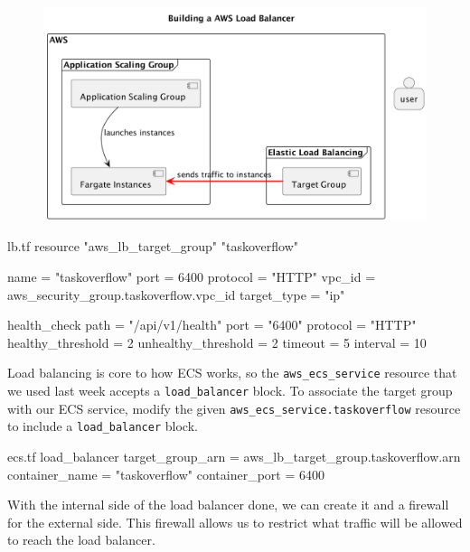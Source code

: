 \documentclass{csse4400}
\begin{document}
\begin{figure}[H]
  \begin{center}
    \includegraphics[scale=0.2]{diagrams/lb2fargate}
  \end{center}
\end{figure}

\begin{code}[language=terraform,numbers=none,keepspaces=true]{lb.tf}
resource "aws_lb_target_group" "taskoverflow" {
  name          = "taskoverflow"
  port          = 6400
  protocol      = "HTTP"
  vpc_id        = aws_security_group.taskoverflow.vpc_id
  target_type   = "ip"

  health_check {
    path                = "/api/v1/health"
    port                = "6400"
    protocol            = "HTTP"
    healthy_threshold   = 2
    unhealthy_threshold = 2
    timeout             = 5
    interval            = 10
  }
}
\end{code}

Load balancing is core to how ECS works, so the \texttt{aws\_ecs\_service} resource that we used last week accepts a \texttt{load\_balancer} block.
To associate the target group with our ECS service,
modify the given \texttt{aws\_ecs\_service.taskoverflow} resource to include a \texttt{load\_balancer} block.

\begin{code}[language=terraform,numbers=none,keepspaces=true]{ecs.tf}
  load_balancer {
    target_group_arn = aws_lb_target_group.taskoverflow.arn
    container_name   = "taskoverflow"
    container_port   = 6400
  }
\end{code}

With the internal side of the load balancer done, we can create it and a firewall for the external side.
This firewall allows us to restrict what traffic will be allowed to reach the load balancer.
\end{document}
